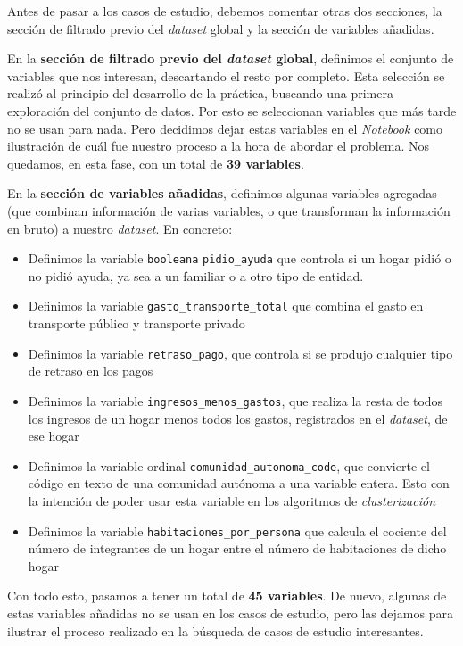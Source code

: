 \documentclass[11pt]{article}
\begin{document}
Antes de pasar a los casos de estudio, debemos comentar otras dos secciones, la sección de filtrado previo del \emph{dataset} global y la sección de variables añadidas.

En la \textbf{sección de filtrado previo del \emph{dataset} global}, definimos el conjunto de variables que nos interesan, descartando el resto por completo. Esta selección se realizó al principio del desarrollo de la práctica, buscando una primera exploración del conjunto de datos. Por esto se seleccionan variables que más tarde no se usan para nada. Pero decidimos dejar estas variables en el \emph{Notebook}  como ilustración de cuál fue nuestro proceso a la hora de abordar el problema. Nos quedamos, en esta fase, con un total de \textbf{39 variables}.

En la \textbf{sección de variables añadidas}, definimos algunas variables agregadas (que combinan información de varias variables, o que transforman la información en bruto) a nuestro \emph{dataset}. En concreto:

\begin{itemize}
    \item Definimos la variable \lstinline{booleana} \lstinline{pidio_ayuda} que controla si un hogar pidió o no pidió ayuda, ya sea a un familiar o a otro tipo de entidad.
    \item Definimos la variable \lstinline{gasto_transporte_total} que combina el gasto en transporte público y transporte privado
    \item Definimos la variable \lstinline{retraso_pago}, que controla si se produjo cualquier tipo de retraso en los pagos
    \item Definimos la variable \lstinline{ingresos_menos_gastos}, que realiza la resta de todos los ingresos de un hogar menos todos los gastos, registrados en el \emph{dataset}, de ese hogar
    \item Definimos la variable ordinal \lstinline{comunidad_autonoma_code}, que convierte el código en texto de una comunidad autónoma a una variable entera. Esto con la intención de poder usar esta variable en los algoritmos de \emph{clusterización}
    \item Definimos la variable \lstinline{habitaciones_por_persona} que calcula el cociente del número de integrantes de un hogar entre el número de habitaciones de dicho hogar
\end{itemize}

Con todo esto, pasamos a tener un total de \textbf{45 variables}. De nuevo, algunas de estas variables añadidas no se usan en los casos de estudio, pero las dejamos para ilustrar el proceso realizado en la búsqueda de casos de estudio interesantes.
\end{document}
